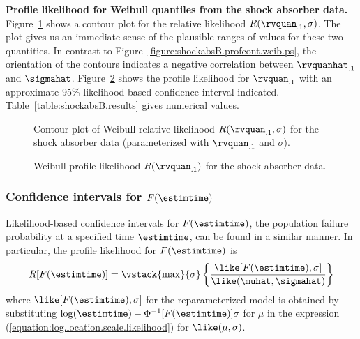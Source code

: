 \begin{example}
{\bf Profile likelihood for Weibull quantiles from the shock absorber data.}
Figure~\ref{figure:shockabsB.weib.sc.T.1.conf.profile.ps} shows a
contour plot for the relative likelihood $R(\rvquan_{.1},\sigma)$.
The plot gives us an immediate sense of the plausible ranges
of values for these two quantities.
In contrast to Figure~\ref{figure:shockabsB.profcont.weib.ps}, the
orientation of the contours indicates a negative correlation between
$\rvquanhat_{.1}$ and $\sigmahat$.
Figure~\ref{figure:shockabsweib.T.1.profile.ps} shows the profile
likelihood for $\rvquan_{.1}$ with an approximate 95\%
likelihood-based confidence interval indicated.
Table~\ref{table:shockabsB.results} gives numerical values.
\begin{figure}
\caption{Contour plot of Weibull relative likelihood $R(\rvquan_{.1},\sigma)$ 
for the shock absorber data (parameterized with $\rvquan_{.1}$ and
$\sigma$).}
\label{figure:shockabsB.weib.sc.T.1.conf.profile.ps}
\end{figure}
\begin{figure}
\caption{Weibull profile likelihood $R(\rvquan_{.1})$ 
for the shock absorber data.}
\label{figure:shockabsweib.T.1.profile.ps}
\end{figure}
\end{example}

\subsubsection{Confidence intervals for $F(\estimtime)$}

Likelihood-based confidence intervals for
$F(\estimtime)$, the population failure probability at
a specified time
$\estimtime$, can be found in a similar manner.  In particular, the
profile likelihood for $F(\estimtime)$ is
\begin{displaymath}
R[F(\estimtime)] = \vstack{\max}{\sigma}
\left\{\frac{\like[F(\estimtime),\sigma]}
{\like(\muhat, \sigmahat)}\right\}
\end{displaymath}
where $\like[F(\estimtime),\sigma]$ for the reparameterized
model is obtained by substituting
$\log(\estimtime)-\Phi^{-1}[F(\estimtime)]\sigma$ for $\mu$ in
the expression (\ref{equation:log.location.scale.likelihood}) for
$\like(\mu, \sigma)$.

